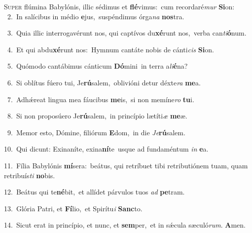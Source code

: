 \lettrine{\initial\textcolor{\initialcolor}{S}}{uper} flúmina Babylónis, illic sédimus et \textbf{flé}\-vimus:~\star cum recordaré\textit{mur} \textbf{Si}\-on:\\
{\numbfont\textcolor{\numbcolor}{~2.}}~In salícibus in médio \textbf{e}\-jus,~\star suspéndimus órga\textit{na} \textbf{nos}\-tra.\par
{\numbfont\textcolor{\numbcolor}{~3.}}~Quia illic interrogavérunt nos, qui captívos du\-\textbf{xé}\-runt nos,~\star verba can\-\textit{ti}\-\textbf{ó}num.\par
{\numbfont\textcolor{\numbcolor}{~4.}}~Et qui abdu\-\textbf{xé}\-runt nos:~\star Hymnum cantáte nobis de cánti\textit{cis} \textbf{Si}\-on.\par
{\numbfont\textcolor{\numbcolor}{~5.}}~Quómodo cantábimus cánticum \textbf{Dó}\-mini~\star in terra a\-\textit{li}\-\textbf{é}na?\par
{\numbfont\textcolor{\numbcolor}{~6.}}~Si oblítus fúero tui, Je\-\textbf{rú}\-salem,~\star oblivióni detur déxte\textit{ra} \textbf{me}\-a.\par
{\numbfont\textcolor{\numbcolor}{~7.}}~Adhǽreat lingua mea fáucibus \textbf{me}\-is,~\star si non memíne\textit{ro} \textbf{tu}\-i.\par
{\numbfont\textcolor{\numbcolor}{~8.}}~Si non proposúero Je\-\textbf{rú}\-salem,~\star in princípio lætíti\textit{æ} \textbf{me}\-æ.\par
{\numbfont\textcolor{\numbcolor}{~9.}}~Memor esto, Dómine, filiórum \textbf{E}\-dom,~\star in die \textit{Je}\-\textbf{rú}salem.\par
{\numbfont\textcolor{\numbcolor}{10.}}~Qui dicunt: Exinaníte, exina\-\textbf{ní}\-te~\star usque ad fundaméntum \textit{in} \textbf{e}\-a.\par
{\numbfont\textcolor{\numbcolor}{11.}}~Fília Babylónis \textbf{mí}\-sera:~\star beátus, qui retríbuet tibi retributiónem tuam, quam retribuís\textit{ti} \textbf{no}\-bis.\par
{\numbfont\textcolor{\numbcolor}{12.}}~Beátus qui te\-\textbf{né}\-bit,~\star et allídet párvulos tuos \textit{ad} \textbf{pe}\-tram.\par
{\numbfont\textcolor{\numbcolor}{13.}}~Glória Patri, et \textbf{Fí}\-lio,~\star et Spirítu\textit{i} \textbf{Sanc}\-to.\par
{\numbfont\textcolor{\numbcolor}{14.}}~Sicut erat in princípio, et nunc, et \textbf{sem}\-per,~\star et in sǽcula sæculó\-\textit{rum}\-. \textbf{A}\-men.\par
